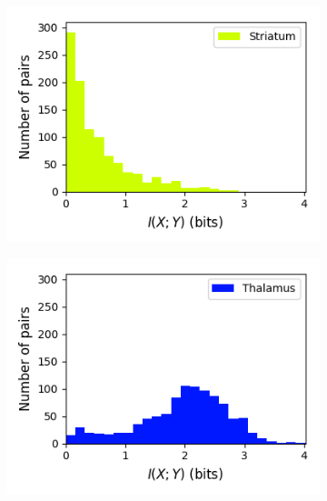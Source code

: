 \documentclass[a4paper,12pt]{article}
\theoremstyle{definition}
\begin{document}
\begin{figure}[p]
\begin{subfigure}{0.5\textwidth}
    \includegraphics[width=\textwidth]{figures/all_striatum_8_1p0_information_histogram.png}
  \end{subfigure}
  \begin{subfigure}{0.5\textwidth}
    \centering
    \includegraphics[width=\textwidth]{figures/all_thalamus_8_1p0_information_histogram.png}
  \end{subfigure}
  \begin{subfigure}{0.5\textwidth}
    \centering

\end{subfigure}
\end{figure}
\end{document}
